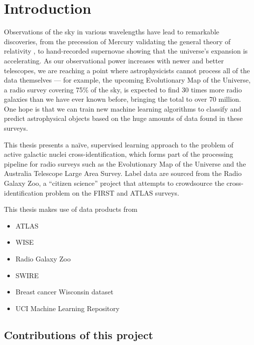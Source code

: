 
\chapter{Introduction}
\label{cha:intro}

Observations of the sky in various wavelengths have lead to remarkable discoveries, from the precession of Mercury validating the general theory of relativity , to hand-recorded supernovae showing that the universe's expansion is accelerating. As our observational power increases with newer and better telescopes, we are reaching a point where astrophysicists cannot process all of the data themselves --- for example, the upcoming Evolutionary Map of the Universe, a radio survey covering 75\% of the sky, is expected to find 30 times more radio galaxies than we have ever known before, bringing the total to over 70 million. One hope is that we can train new machine learning algorithms to classify and predict astrophysical objects based on the huge amounts of data found in these surveys.

This thesis presents a na\"ive, supervised learning approach to the problem of active galactic nuclei cross-identification, which forms part of the processing pipeline for radio surveys such as the Evolutionary Map of the Universe and the Australia Telescope Large Area Survey. Label data are sourced from the Radio Galaxy Zoo, a ``citizen science'' project that attempts to crowdsource the cross-identification problem on the FIRST and ATLAS surveys.


This thesis makes use of data products from
\begin{itemize}
    \item ATLAS
    \item WISE
    \item Radio Galaxy Zoo
    \item SWIRE
    \item Breast cancer Wisconsin dataset
    \item UCI Machine Learning Repository
\end{itemize}


\section{Contributions of this project}

